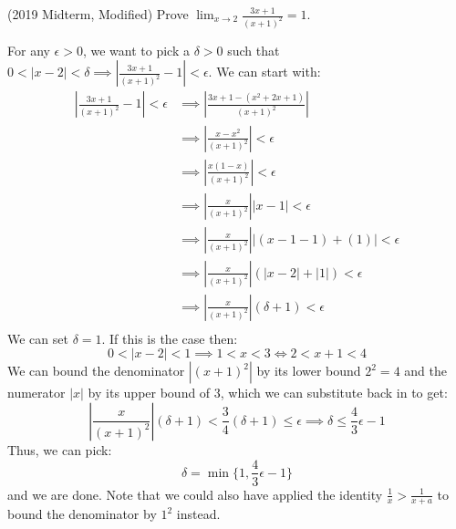 \documentclass{article}
\begin{document}
\begin{example}
(2019 Midterm, Modified) Prove $\displaystyle \lim_{x\to 2} \frac{3x+1}{(x+1)^2}=1$.
\vspace{2mm}

For any $\epsilon > 0$, we want to pick a $\delta > 0$ such that $0<|x-2|<\delta \implies \left|\frac{3x+1}{(x+1)^2}-1\right|<\epsilon$. We can start with:
\begin{align}
    \left|\frac{3x+1}{(x+1)^2}-1\right|<\epsilon &\implies \left|\frac{3x+1-(x^2+2x+1)}{(x+1)^2}\right| \\ 
    &\implies \left|\frac{x-x^2}{(x+1)^2}\right|<\epsilon \\ 
    &\implies \left|\frac{x(1-x)}{(x+1)^2}\right|<\epsilon \\
    &\implies \left|\frac{x}{(x+1)^2}\right||x-1|<\epsilon \\
    &\implies \left|\frac{x}{(x+1)^2}\right||(x-1-1)+(1)|<\epsilon \\
    &\implies \left|\frac{x}{(x+1)^2}\right|(|x-2|+|1|)<\epsilon \\
    &\implies \left|\frac{x}{(x+1)^2}\right|(\delta+1)<\epsilon \\
    \label{eq:}
\end{align}
We can set $\delta=1$. If this is the case then:
\begin{equation}
    0<|x-2|<1 \implies 1<x<3 \iff 2<x+1<4
    \label{eq:}
\end{equation}
We can bound the denominator $|(x+1)^2|$ by its lower bound $2^2=4$ and the numerator $|x|$ by its upper bound of $3$, which we can substitute back in to get:
\begin{equation}
    \left|\frac{x}{(x+1)^2}\right|(\delta+1)<\frac{3}{4}(\delta+1)\le \epsilon \implies \delta \le \frac{4}{3}\epsilon-1
    \label{eq:}
\end{equation}
Thus, we can pick:
\begin{equation}
    \delta = \min\{1,\frac{4}{3}\epsilon-1\}
    \label{eq:}
\end{equation}
and we are done. Note that we could also have applied the identity $\frac{1}{x}>\frac{1}{x+a}$ to bound the denominator by $1^2$ instead.
\end{example}
\end{document}
